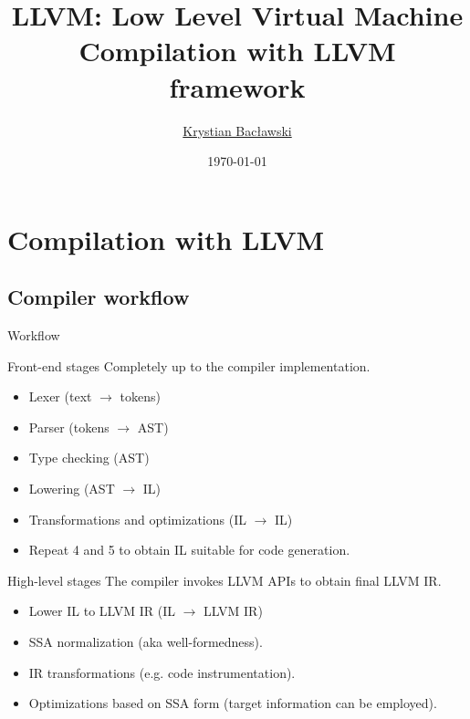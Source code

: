 \documentclass[8pt]{beamer}
\title[LLVM]{LLVM: Low Level Virtual Machine\\Compilation with LLVM framework}
\author[Krystian Bacławski]{\href{mailto:cahirwpz@cs.uni.wroc.pl}{Krystian Bacławski}}
\institute{Computer Science Department\\University of Wrocław}
\date{\today}
\begin{document}
\begin{frame}
\titlepage
\end{frame}

\section[Compilation]{Compilation with LLVM}
\subsection*{Compiler workflow}

\begin{frame}{Workflow}
  \begin{block}{Front-end stages}
    Completely up to the compiler implementation.
    \begin{itemize}
      \item Lexer (text $\rightarrow$ tokens)
      \item Parser (tokens $\rightarrow$ AST)
      \item Type checking (AST)
      \item Lowering (AST $\rightarrow$ IL)
      \item Transformations and optimizations (IL $\rightarrow$ IL)
      \item Repeat 4 and 5 to obtain IL suitable for code generation.
    \end{itemize}
  \end{block}
  
  \begin{block}{High-level stages}
    The compiler invokes LLVM APIs to obtain final LLVM IR.
    \begin{itemize}
      \item Lower IL to LLVM IR (IL $\rightarrow$ LLVM IR)
      \item SSA normalization (aka well-formedness).
      \item IR transformations (e.g. code instrumentation).
      \item Optimizations based on SSA form (target information can be
        employed).
    \end{itemize}
  \end{block}
\end{frame}
\end{document}
